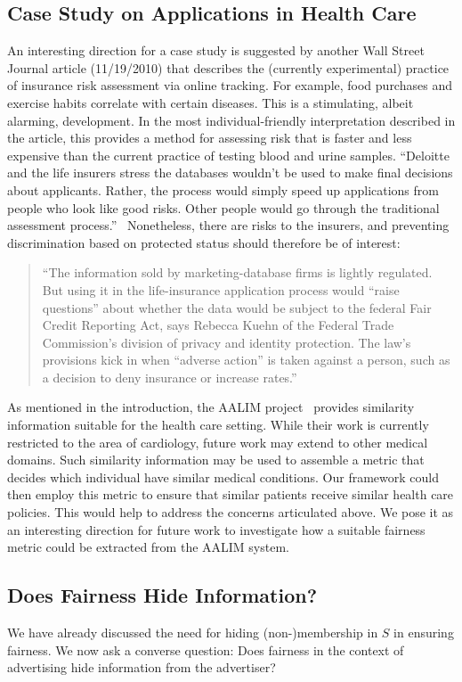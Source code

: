 \documentclass[letterpaper,11pt]{article}
\theoremstyle{definition}
\begin{document}
\subsection{Case Study on Applications in Health Care}
An interesting direction for a case study is suggested by
another Wall Street Journal article (11/19/2010) that describes
the (currently experimental) practice of
insurance risk assessment via online tracking.  For example,
food purchases and exercise habits correlate with certain diseases.
This is a stimulating, albeit alarming, development.  In the most
individual-friendly interpretation described
in the article, this provides a method for assessing risk
that is faster and less expensive than the current practice of testing blood and
urine samples.
``Deloitte and the life insurers stress the databases wouldn't be used
to make final decisions about applicants. Rather, the process would
simply speed up applications from people who look like good
risks. Other people would go through the traditional assessment
process.''~\cite{WSJ:insurance}
Nonetheless, there are risks to the insurers, and preventing
discrimination based on protected status should therefore be of interest:
\begin{quote}
``The information sold by marketing-database firms is lightly regulated. But
  using it in the life-insurance application process would ``raise questions''
  about whether the data would be subject to the federal Fair Credit Reporting
  Act, says Rebecca Kuehn of the Federal Trade Commission's division of
  privacy and identity protection. The law's provisions kick in when ``adverse
  action'' is taken against a person, such as a decision to deny insurance or
  increase rates.''
\end{quote}

As mentioned in the introduction, the AALIM project~\cite{AALIM} provides
similarity information suitable for the health care setting. While their work
is currently restricted to the area of cardiology, future work may extend to
other medical domains. Such similarity information may be used to
assemble a metric that decides which individual have similar medical
conditions. Our framework could then employ this metric to ensure that similar
patients receive similar health care policies. This would help to address the
concerns articulated above. We pose it as an interesting direction for future
work to investigate how a suitable fairness metric could be extracted from the
AALIM system.


\subsection{Does Fairness Hide Information?}
We have already discussed the need for 
hiding (non-)membership in $S$
in ensuring fairness. We now ask a converse question:
Does fairness in the context of advertising hide information from the
advertiser?
\end{document}
